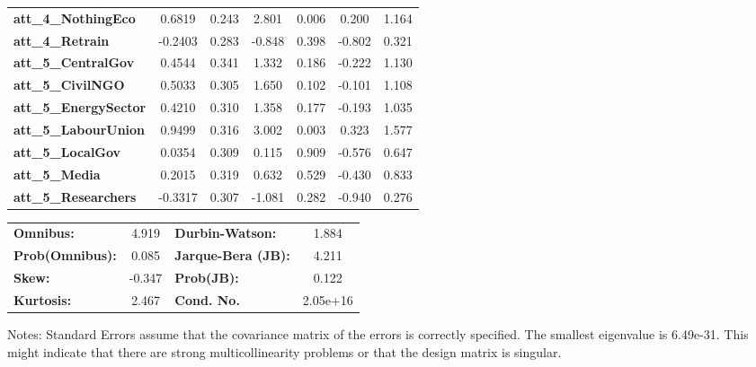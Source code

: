\begin{center}
\begin{tabular}{lcccccc}
\textbf{att\_4\_NothingEco}                         &       0.6819  &        0.243     &     2.801  &         0.006        &        0.200    &        1.164     \\
\textbf{att\_4\_Retrain}                            &      -0.2403  &        0.283     &    -0.848  &         0.398        &       -0.802    &        0.321     \\
\textbf{att\_5\_CentralGov}                         &       0.4544  &        0.341     &     1.332  &         0.186        &       -0.222    &        1.130     \\
\textbf{att\_5\_CivilNGO}                           &       0.5033  &        0.305     &     1.650  &         0.102        &       -0.101    &        1.108     \\
\textbf{att\_5\_EnergySector}                       &       0.4210  &        0.310     &     1.358  &         0.177        &       -0.193    &        1.035     \\
\textbf{att\_5\_LabourUnion}                        &       0.9499  &        0.316     &     3.002  &         0.003        &        0.323    &        1.577     \\
\textbf{att\_5\_LocalGov}                           &       0.0354  &        0.309     &     0.115  &         0.909        &       -0.576    &        0.647     \\
\textbf{att\_5\_Media}                              &       0.2015  &        0.319     &     0.632  &         0.529        &       -0.430    &        0.833     \\
\textbf{att\_5\_Researchers}                        &      -0.3317  &        0.307     &    -1.081  &         0.282        &       -0.940    &        0.276     \\
\bottomrule
\end{tabular}
\begin{tabular}{lclc}
\textbf{Omnibus:}       &  4.919 & \textbf{  Durbin-Watson:     } &    1.884  \\
\textbf{Prob(Omnibus):} &  0.085 & \textbf{  Jarque-Bera (JB):  } &    4.211  \\
\textbf{Skew:}          & -0.347 & \textbf{  Prob(JB):          } &    0.122  \\
\textbf{Kurtosis:}      &  2.467 & \textbf{  Cond. No.          } & 2.05e+16  \\
\bottomrule
\end{tabular}
\end{center}

Notes: \newline
 [1] Standard Errors assume that the covariance matrix of the errors is correctly specified. \newline
 [2] The smallest eigenvalue is 6.49e-31. This might indicate that there are \newline
 strong multicollinearity problems or that the design matrix is singular.